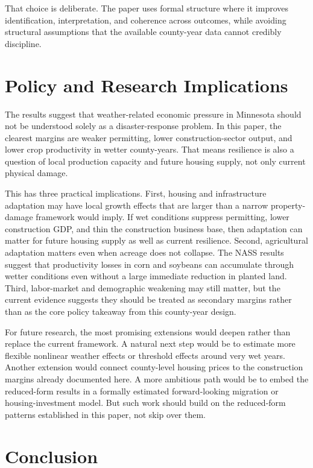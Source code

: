 \documentclass[12pt]{article}
\begin{document}
That choice is deliberate. The paper uses formal structure where it improves identification, interpretation, and coherence across outcomes, while avoiding structural assumptions that the available county-year data cannot credibly discipline.

\section{Policy and Research Implications}

The results suggest that weather-related economic pressure in Minnesota should not be understood solely as a disaster-response problem. In this paper, the clearest margins are weaker permitting, lower construction-sector output, and lower crop productivity in wetter county-years. That means resilience is also a question of local production capacity and future housing supply, not only current physical damage.

This has three practical implications. First, housing and infrastructure adaptation may have local growth effects that are larger than a narrow property-damage framework would imply. If wet conditions suppress permitting, lower construction GDP, and thin the construction business base, then adaptation can matter for future housing supply as well as current resilience. Second, agricultural adaptation matters even when acreage does not collapse. The NASS results suggest that productivity losses in corn and soybeans can accumulate through wetter conditions even without a large immediate reduction in planted land. Third, labor-market and demographic weakening may still matter, but the current evidence suggests they should be treated as secondary margins rather than as the core policy takeaway from this county-year design.

For future research, the most promising extensions would deepen rather than replace the current framework. A natural next step would be to estimate more flexible nonlinear weather effects or threshold effects around very wet years. Another extension would connect county-level housing prices to the construction margins already documented here. A more ambitious path would be to embed the reduced-form results in a formally estimated forward-looking migration or housing-investment model. But such work should build on the reduced-form patterns established in this paper, not skip over them.

\section{Conclusion}
\end{document}
